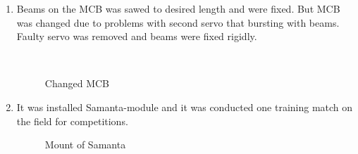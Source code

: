 \begin{enumerate}
	\item Beams on the MCB was sawed to desired length and were fixed. But MCB was changed due to problems with second servo that bursting with beams. Faulty servo was removed and beams were fixed rigidly.
	\begin{figure}[H]
		\begin{minipage}[h]{0.2\linewidth}
			\center  
		\end{minipage}
		\begin{minipage}[h]{0.6\linewidth}
			\caption{Changed MCB}
		\end{minipage}
	\end{figure}
	
	\item It was installed Samanta-module and it was conducted one training match on the field for competitions.
	
	\begin{figure}[H]
		\begin{minipage}[h]{1\linewidth}
		\end{minipage}
		\caption{Mount of Samanta}
	\end{figure}
	 	
\end{enumerate}
\fillpage